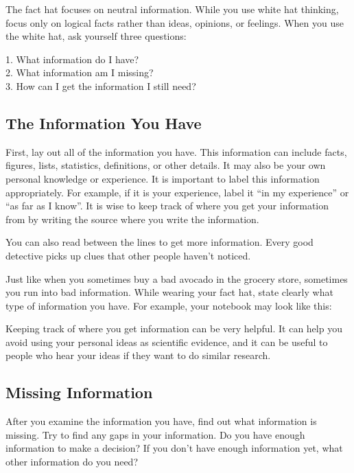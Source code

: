 The fact hat focuses on neutral information. While you use white hat thinking, focus only on logical facts rather than ideas, opinions, or feelings. When you use the white hat, ask yourself three questions:

1. What information do I have? \\
2. What information am I missing? \\
3. How can I get the information I still need?

\subsection*{The Information You Have}
First, lay out all of the information you have. This information can include facts, figures, lists, statistics, definitions, or other details. It may also be your own personal knowledge or experience. It is important to label this information appropriately. For example, if it is your experience, label it ``in my experience'' or ``as far as I know''. It is wise to keep track of where you get your information from by writing the source where you write the information.

You can also read between the lines to get more information. Every good detective picks up clues that other people haven't noticed.

Just like when you sometimes buy a bad avocado in the grocery store, sometimes you run into bad information. While wearing your fact hat, state clearly what type of information you have. For example, your notebook may look like this:



Keeping track of where you get information can be very helpful. It can help you avoid using your personal ideas as scientific evidence, and it can be useful to people who hear your ideas if they want to do similar research.

\subsection*{Missing Information}
After you examine the information you have, find out what information is missing. Try to find any gaps in your information. Do you have enough information to make a decision? If you don't have enough information yet, what other information do you need?

